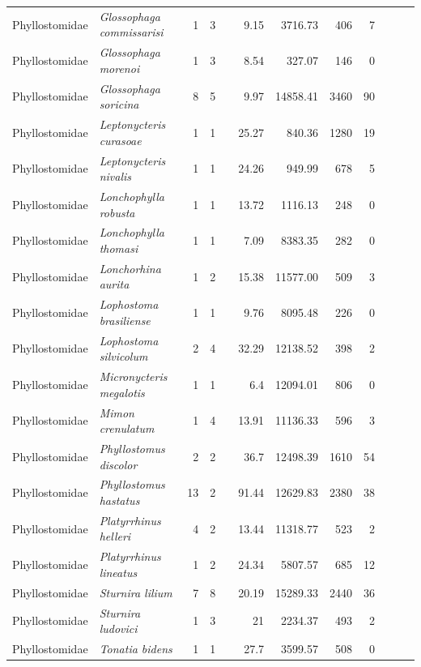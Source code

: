 \begin{landscape}
\begin{longtable}{@{}llrrrrrrrrrl@{}}
  Phyllostomidae & \emph{Glossophaga commissarisi} & 1 & 3 &  & 9.15 & 3716.73 & 406 & 7 &  &  &  \\ 
  Phyllostomidae & \emph{Glossophaga morenoi} & 1 & 3 &  & 8.54 & 327.07 & 146 & 0 &  &  &  \\ 
  Phyllostomidae & \emph{Glossophaga soricina} & 8 & 5 &  & 9.97 & 14858.41 & 3460 & 90 &  &  &  \\ 
  Phyllostomidae & \emph{Leptonycteris curasoae} & 1 & 1 &  & 25.27 & 840.36 & 1280 & 19 &  &  &  \\ 
  Phyllostomidae & \emph{Leptonycteris nivalis} & 1 & 1 &  & 24.26 & 949.99 & 678 & 5 &  &  &  \\ 
  Phyllostomidae & \emph{Lonchophylla robusta} & 1 & 1 &  & 13.72 & 1116.13 & 248 & 0 &  &  &  \\ 
  Phyllostomidae & \emph{Lonchophylla thomasi} & 1 & 1 &  & 7.09 & 8383.35 & 282 & 0 &  &  &  \\ 
  Phyllostomidae & \emph{Lonchorhina aurita} & 1 & 2 &  & 15.38 & 11577.00 & 509 & 3 &  &  &  \\ 
  Phyllostomidae & \emph{Lophostoma brasiliense} & 1 & 1 &  & 9.76 & 8095.48 & 226 & 0 &  &  &  \\ 
  Phyllostomidae & \emph{Lophostoma silvicolum} & 2 & 4 &  & 32.29 & 12138.52 & 398 & 2 &  &  &  \\ 
  Phyllostomidae & \emph{Micronycteris megalotis} & 1 & 1 &  & 6.4 & 12094.01 & 806 & 0 &  &  &  \\ 
  Phyllostomidae & \emph{Mimon crenulatum} & 1 & 4 &  & 13.91 & 11136.33 & 596 & 3 &  &  &  \\ 
  Phyllostomidae & \emph{Phyllostomus discolor} & 2 & 2 &  & 36.7 & 12498.39 & 1610 & 54 &  &  &  \\ 
  Phyllostomidae & \emph{Phyllostomus hastatus} & 13 & 2 &  & 91.44 & 12629.83 & 2380 & 38 &  &  &  \\ 
  Phyllostomidae & \emph{Platyrrhinus helleri} & 4 & 2 &  & 13.44 & 11318.77 & 523 & 2 &  &  &  \\ 
  Phyllostomidae & \emph{Platyrrhinus lineatus} & 1 & 2 &  & 24.34 & 5807.57 & 685 & 12 &  &  &  \\ 
  Phyllostomidae & \emph{Sturnira lilium} & 7 & 8 &  & 20.19 & 15289.33 & 2440 & 36 &  &  &  \\ 
  Phyllostomidae & \emph{Sturnira ludovici} & 1 & 3 &  & 21 & 2234.37 & 493 & 2 &  &  &  \\ 
  Phyllostomidae & \emph{Tonatia bidens} & 1 & 1 &  & 27.7 & 3599.57 & 508 & 0 &  &  &  \\ 

\end{longtable}
\end{landscape}
